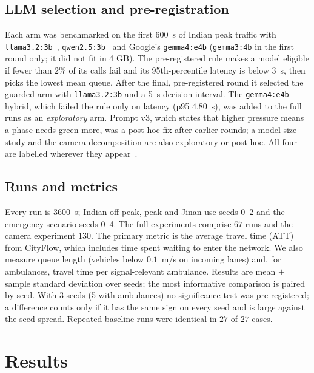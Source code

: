 \documentclass[conference]{IEEEtran}
\newcommand{\V}[2]{\ensuremath{#2}}
\newcommand{\model}[1]{\texttt{#1}}
\begin{document}
\subsection{LLM selection and pre-registration}
Each arm was benchmarked on the first \V{b.steps}{600}~s of Indian peak traffic with
\model{llama3.2:3b}~\cite{grattafiori2024llama3}, \model{qwen2.5:3b}~\cite{qwen2024qwen25}
and Google's \model{gemma4:e4b} (\model{gemma3:4b} in the first round only; it did not fit in
4 GB). The pre-registered rule makes a model eligible if fewer than
\V{b.rule.fail_pct}{2}\% of its calls fail and its 95th-percentile latency is below
\V{b.rule.p95_s}{3}~s, then picks the lowest mean queue. After the final, pre-registered round
it selected the guarded arm with \model{llama3.2:3b} and a 5~s decision interval. The
\model{gemma4:e4b} hybrid, which failed the rule only on latency (p95
\V{b.hybrid_v3.gemma4:e4b.p95}{4.80}~s), was added to the full runs as an \emph{exploratory}
arm. Prompt v3, which states that higher pressure means a phase needs green more, was a
post-hoc fix after earlier rounds; a model-size study and the camera decomposition are also
exploratory or post-hoc. All four are labelled wherever they appear~\cite{nosek2018prereg}.

\subsection{Runs and metrics}
Every run is \V{cfg.steps}{3600}~s; Indian off-peak, peak and Jinan use seeds 0--2 and the
emergency scenario seeds 0--4. The full experiments comprise \V{f.runs}{67} runs and the camera
experiment \V{c.runs}{130}. The primary metric is the average travel time (ATT) from CityFlow,
which includes time spent waiting to enter the network. We also measure queue length (vehicles
below \V{code.stop_speed}{0.1}~m/s on incoming lanes) and, for ambulances, travel time per
signal-relevant ambulance. Results are mean $\pm$ sample standard deviation over seeds; the most
informative comparison is paired by seed. With 3 seeds (5 with ambulances) no significance test
was pre-registered; a difference counts only if it has the same sign on every seed and is large
against the seed spread. Repeated baseline runs were identical in
\V{f.reproduced}{27} of \V{f.reproduced_of}{27} cases.

\section{Results}
\end{document}
